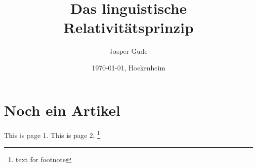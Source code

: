 \documentclass[12pt]{scrreprt}
\title{Das linguistische Relativitätsprinzip}
\author{Jasper Gude}
\date{\today{}, Hockenheim}
\begin{document}
\maketitle
\tableofcontents
\listoffigures
\listoftables

\chapter{Noch ein Artikel}
This is page 1.\newpage
This is page 2.
\footnote{text for footnote}
\end{document}
